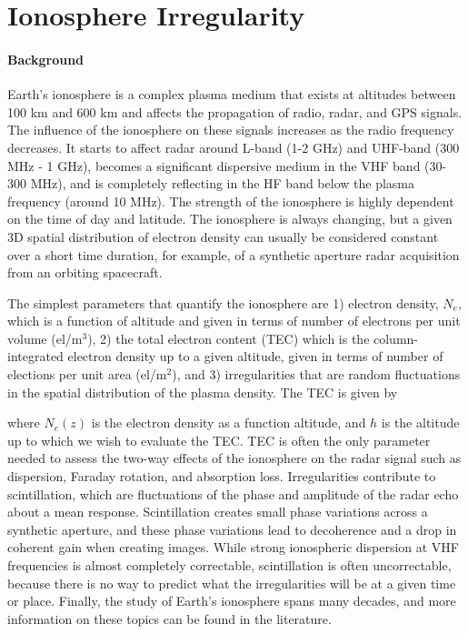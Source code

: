 {\footnotesize
{}
}

\clearpage

\section{Ionosphere Irregularity}
\paragraph{Background} Earth's ionosphere is a complex plasma medium that exists at altitudes between 100 km and 600 km and affects the propagation of radio, radar, and GPS signals. The influence of the ionosphere on these signals increases as the radio frequency decreases. It starts to affect radar around L-band (1-2 GHz) and UHF-band (300 MHz - 1 GHz), becomes a significant dispersive medium in the VHF band (30-300 MHz), and is completely reflecting in the HF band below the plasma frequency (around 10 MHz). The strength of the ionosphere is highly dependent on the time of day and latitude. The ionosphere is always changing, but a given 3D spatial distribution of electron density can usually be considered constant over a short time duration, for example, of a synthetic aperture radar acquisition from an orbiting spacecraft.  

The simplest parameters that quantify the ionosphere are 1) electron density, $N_e$, which is a function of altitude and given in terms of number of electrons per unit volume (el/m$^3$), 2) the total electron content (TEC) which is the column-integrated electron density up to a given altitude, given in terms of number of elections per unit area (el/m$^2$), and 3) irregularities that are random fluctuations in the spatial distribution of the plasma density. The TEC is given by 

\noindent where $N_e(z)$ is the electron density as a function altitude, and $h$ is the altitude up to which we wish to evaluate the TEC. TEC is often the only parameter needed to assess the two-way effects of the ionosphere on the radar signal such as dispersion, Faraday rotation, and absorption loss. Irregularities contribute to scintillation, which are fluctuations of the phase and amplitude of the radar echo about a mean response. Scintillation creates small phase variations across a synthetic aperture, and these phase variations lead to decoherence and a drop in coherent gain when creating images. While strong ionospheric dispersion at VHF frequencies is almost completely correctable, scintillation is often uncorrectable, because there is no way to predict what the irregularities will be at a given time or place. Finally, the study of Earth's ionosphere spans many decades, and more information on these topics can be found in the literature.

